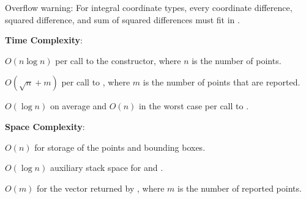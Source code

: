 Overflow warning: For integral coordinate types, every coordinate difference, squared difference, and sum of squared differences must fit in .

\textbf{Time Complexity}:
\begin{compactitem}
  \item $O(n \log n)$ per call to the constructor, where $n$ is the number of points.
  \item $O(\sqrt{n} + m)$ per call to , where $m$ is the number of points that are reported.
  \item $O(\log n)$ on average and $O(n)$ in the worst case per call to .
\end{compactitem}

\textbf{Space Complexity}:
\begin{compactitem}
  \item $O(n)$ for storage of the points and bounding boxes.
  \item $O(\log n)$ auxiliary stack space for  and .
  \item $O(m)$ for the vector returned by , where $m$ is the number of reported points.
\end{compactitem}

